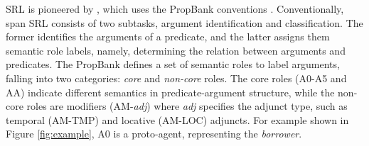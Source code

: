 \documentclass[letterpaper]{article} %
\begin{document}
SRL is pioneered by \citeauthor{gildea2002} , which uses the PropBank conventions \cite{propbank}.
Conventionally, span SRL consists of two subtasks, argument identification and classification. The former identifies the arguments of a predicate, and the latter assigns them semantic role labels, namely, determining the relation between arguments and predicates. The PropBank defines a set of semantic roles to label arguments, falling into two categories: \textit{core} and \textit{non-core} roles. The core roles (A0-A5 and AA) indicate different semantics in predicate-argument structure, while the non-core roles are modifiers (AM-\textit{adj}) where \textit{adj} specifies the adjunct type, such as temporal (AM-TMP) and locative (AM-LOC) adjuncts. For example shown in Figure \ref{fig:example}, A0 is a proto-agent, representing the \textit{borrower}.



\end{document}
